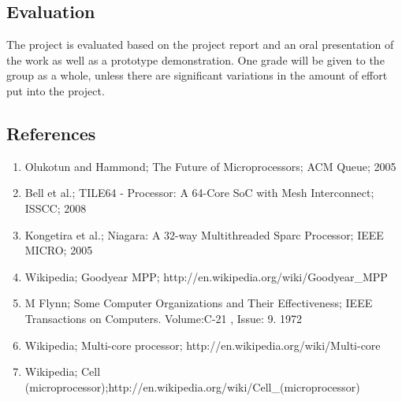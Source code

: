\subsection{Evaluation}
The project is evaluated based on the project report and an oral presentation of the work as well as a 
prototype  demonstration.  One  grade  will  be  given  to  the  group  as  a  whole,  unless  there  are 
significant variations in the amount of effort put into the project.

\subsection{References}

\begin{enumerate}
	\item Olukotun and Hammond; The Future of Microprocessors; ACM Queue; 2005 
\item Bell et al.; TILE64 - Processor: A 64-Core SoC with Mesh Interconnect; ISSCC; 2008  
\item Kongetira et al.; Niagara: A 32-way Multithreaded Sparc Processor; IEEE MICRO; 2005 
\item Wikipedia; Goodyear MPP; http://en.wikipedia.org/wiki/Goodyear\_MPP 
\item M Flynn; Some Computer Organizations and Their Effectiveness; IEEE Transactions on Computers. Volume:C-21 ,  Issue: 9. 1972 
\item Wikipedia; Multi-core processor; http://en.wikipedia.org/wiki/Multi-core 
\item Wikipedia; Cell (microprocessor);http://en.wikipedia.org/wiki/Cell\_(microprocessor) 
\end{enumerate}

